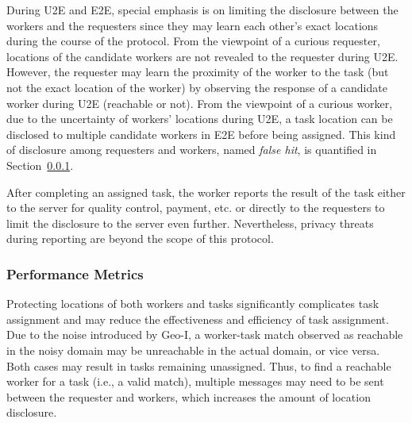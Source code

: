 \documentclass{USC-Thesis}
\numberwithin{equation}{chapter}
\begin{document}
During U2E and E2E, special emphasis is on limiting the disclosure between the workers and the requesters since they may learn each other's exact locations during the course of the protocol. From the viewpoint of a curious requester, locations of the candidate workers are not revealed to the requester during U2E. However, the requester may learn the proximity of the worker to the task (but not the exact location of the worker) by observing the response of a candidate worker during U2E (reachable or not). From the viewpoint of a curious worker, due to the uncertainty of workers' locations during U2E, a task location can be disclosed to multiple candidate workers in E2E before being assigned. This kind of disclosure among requesters and workers, named \emph{false hit}, is quantified in Section~\ref{sec:metrics2}.

After completing an assigned task, the worker reports the result of the task either to the server for quality control, payment, etc. or directly to the requesters to limit the disclosure to the server even further. Nevertheless, privacy threats during reporting are beyond the scope of this protocol.

\subsubsection{Performance Metrics}
\label{sec:metrics2}

Protecting locations of both workers and tasks significantly complicates task assignment and may reduce the effectiveness and efficiency of task assignment. Due to the noise introduced by Geo-I, a worker-task match observed as reachable in the noisy domain may be unreachable in the actual domain, or vice versa. Both cases may result in tasks remaining unassigned. Thus, to find a reachable worker for a task (i.e., a valid match), multiple messages may need to be sent between the requester and workers, which increases the amount of location disclosure.
\end{document}
